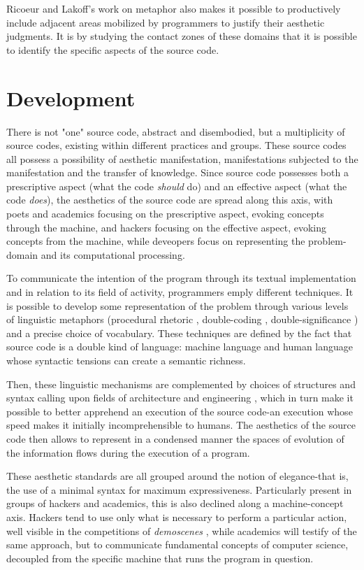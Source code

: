 \documentclass{article}
\begin{document}
Ricoeur and Lakoff's work on metaphor also makes it possible to productively include adjacent areas mobilized by programmers to justify their aesthetic judgments. It is by studying the contact zones of these domains that it is possible to identify the specific aspects of the source code.

\section{Development}

There is not "one" source code, abstract and disembodied, but a multiplicity of source codes, existing within different practices and groups. These source codes all possess a possibility of aesthetic manifestation, manifestations subjected to the manifestation and the transfer of knowledge. Since source code possesses both a prescriptive aspect (what the code \emph{should} do) and an effective aspect (what the code \emph{does}), the aesthetics of the source code are spread along this axis, with poets and academics focusing on the prescriptive aspect, evoking concepts through the machine, and hackers focusing on the effective aspect, evoking concepts from the machine, while deveopers focus on representing the problem-domain and its computational processing.

To communicate the intention of the program through its textual implementation and in relation to its field of activity, programmers emply different techniques. It is possible to develop some representation of the problem through various levels of linguistic metaphors (procedural rhetoric \citep{bogost_rhetoric_2008}, double-coding \citep{cox_speaking_2013}, double-significance \citep{paloque-berges_poetique_2009}) and a precise choice of vocabulary. These techniques are defined by the fact that source code is a double kind of language: machine language and human language whose syntactic tensions can create a semantic richness.

Then, these linguistic mechanisms are complemented by choices of structures and syntax calling upon fields of architecture and engineering \citep{gabriel_patterns_1998,schummer_aesthetic_2009}, which in turn make it possible to better apprehend an execution of the source code-an execution whose speed makes it initially incomprehensible to humans. The aesthetics of the source code then allows to represent in a condensed manner the spaces of evolution of the information flows during the execution of a program.

These aesthetic standards are all grouped around the notion of elegance-that is, the use of a minimal syntax for maximum expressiveness. Particularly present in groups of hackers and academics, this is also declined along a machine-concept axis. Hackers tend to use only what is necessary to perform a particular action, well visible in the competitions of \emph{demoscenes} \citep{kudra_aoc_2020}, while academics will testify of the same approach, but to communicate fundamental concepts of computer science, decoupled from the specific machine that runs the program in question.
\end{document}
